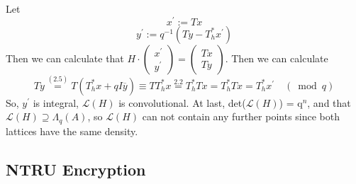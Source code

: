 Let\newline
\begin{equation}
    x^{\prime} :=Tx
\end{equation}
\begin{equation}
    y^{\prime} :=q^{-1}\left(T y-T_{h}^{*} x^{\prime}\right)
\end{equation}
Then we can calculate that $H \cdot\left(\begin{array}{c}{x^{\prime}} \\ {y^{\prime}}\end{array}\right)=\left(\begin{array}{l}{T x} \\ {T y}\end{array}\right)$. Then we can calculate\newline
\begin{equation}
    T y \stackrel{(2.5)}{=} T\left(T_{h}^{*} x+q I \overline{y}\right) \equiv T T_{h}^{*} x \stackrel{2.2}{=} T_{h}^{*} T x=T_{h}^{*} T x=T_{h}^{*} x^{\prime} \quad(\bmod q)
\end{equation}
So, $y^{\prime}$ is integral, $\mathcal{L}(H)$ is convolutional. \newline
At last, det($\mathcal{L}(H)$) = q$^n$, and that $\mathcal{L}(H) \supseteq \Lambda_{q}(A)$, so $\mathcal{L}(H)$ can not contain any further points since both lattices have the same density.

\subsection{NTRU Encryption}

